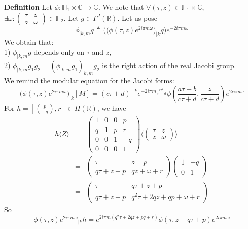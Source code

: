 \documentclass[10pt,a4paper]{article}
\begin{document}
\textbf{Definition} Let $\phi:\mathbb{H}_1\times\mathbb{C}\rightarrow\mathbb{C}$. We note that $\forall(\tau,z)\in\mathbb{H}_1\times\mathbb{C}$, $\exists\omega:\left(\begin{array}{cc}\tau &z \\ z &\omega	\end{array}\right)\in\mathbb{H}_2$. Let $g\in\Gamma^J(\mathbb{R})$. Let us pose
\[\phi_{|k,m}g\triangleq\Big(\big(\phi(\tau,z)e^{2i\pi m\omega}\big)_{|k}g\Big)e^{-2i\pi m\omega}\]
We obtain that:\\
1) $\phi_{|k,m}g$ depends only on $\tau$ and $z$,\\
2) $\phi_{|k,m}g_1g_2=(\phi_{|k,m}g_1)_{k,m}g_2$ is the right action of the real Jacobi group. \\
We remind the modular equation for the Jacobi forms:
\[\big(\phi(\tau,z)e^{2i\pi m\omega}\big)_{|k}[M]=(c\tau+d)^{-k}e^{-2i\pi m\frac{cz^2}{c\tau+d}}\phi\left(\frac{a\tau+b}{c\tau+d},\frac{z}{c\tau+d}\right)e^{2i\pi m\omega}\]
For $h=\left[\binom{p}{-q},r\right]\in H(\mathbb{R})$, we have
\begin{eqnarray*}
h\langle Z\rangle&=&\left(\begin{array}{cccc}1&0&0&p\\q&1&p&r\\0&0&1&-q\\0&0&0&1
\end{array}\right)\langle\left(\begin{array}{cc}\tau &z\\z&\omega\end{array}\right)\rangle\\
&=&\left(\begin{array}{cc}\tau&z+p\\q\tau+z+p&qz+\omega+r\end{array}\right)\left(\begin{array}{cc}1&-q\\0&1\end{array}\right)\\
&=&\left(\begin{array}{cc}\tau&q\tau+z+p\\q\tau+z+p&q^2\tau+2qz+qp+\omega+r\end{array}\right)
\end{eqnarray*}
So 
\[\phi(\tau,z){e^{2i\pi m\omega}}_{|k}h=e^{2i\pi m(q^2\tau+2qz+pq+r)}\phi(\tau,z+q\tau+p)e^{2i\pi m \omega}\]
\end{document}
